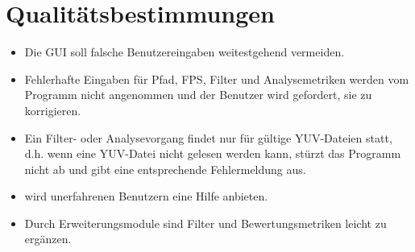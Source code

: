 \chapter{Qualitätsbestimmungen}

\begin{itemize}
\item Die GUI soll falsche Benutzereingaben weitestgehend vermeiden.
\item Fehlerhafte Eingaben für Pfad, FPS, Filter und Analysemetriken werden vom Programm nicht angenommen und der Benutzer wird gefordert, sie zu korrigieren.
\item Ein Filter- oder Analysevorgang findet nur für gültige YUV-Dateien statt, d.h. wenn eine YUV-Datei nicht gelesen werden kann, stürzt das Programm nicht ab und gibt eine entsprechende Fehlermeldung aus.
\item \projektTitel wird unerfahrenen Benutzern eine Hilfe anbieten.
\item Durch Erweiterungsmodule sind Filter und Bewertungsmetriken leicht zu ergänzen.

\end{itemize}
